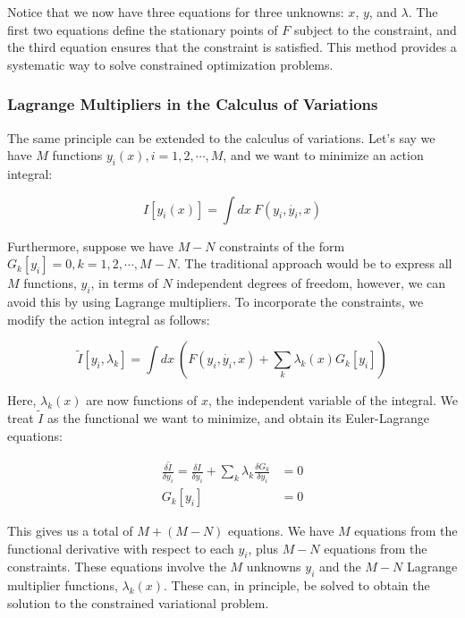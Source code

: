 Notice that we now have three equations for three unknowns: $x$, $y$, and $\lambda$. The first two equations define the stationary points of $F$ subject to the constraint, and the third equation ensures that the constraint is satisfied. This method provides a systematic way to solve constrained optimization problems.

\subsubsection{Lagrange Multipliers in the Calculus of Variations}

The same principle can be extended to the calculus of variations. Let's say we have $M$ functions $y_i\left(x\right), i = 1, 2, \cdots, M$, and we want to minimize an action integral:

\begin{equation}
    I[y_i\left(x\right)] = \int dx \ F\left(y_i, \dot{y_i}, x\right)
\end{equation}

Furthermore, suppose we have $M-N$ constraints of the form $G_k[y_i] = 0, k = 1, 2, \cdots, M - N$. The traditional approach would be to express all $M$ functions, $y_i$, in terms of $N$ independent degrees of freedom, however, we can avoid this by using Lagrange multipliers. To incorporate the constraints, we modify the action integral as follows:

\begin{equation}
    \tilde{I}[y_i, \lambda_k] = \int dx \ \left(F\left(y_i, \dot{y_i}, x\right) + \sum_k \lambda_k \left(x\right) G_k[y_i]\right)
\end{equation}

Here, $\lambda_k(x)$ are now functions of $x$, the independent variable of the integral. 
We treat $\tilde{I}$ as the functional we want to minimize, and obtain its Euler-Lagrange equations:

\begin{align}
    \frac{\delta \tilde{I}}{\delta y_i}  = \frac{\delta I}{\delta y_i} + \sum_k \lambda_k \frac{\delta G_k}{\delta y_i} &= 0 \\
    G_k[y_i] &= 0
\end{align}

This gives us a total of $M + (M - N)$ equations. We have $M$ equations from the functional derivative with respect to each $y_i$, plus $M-N$ equations from the constraints. These equations involve the $M$ unknowns  $y_i$ and the $M-N$ Lagrange multiplier functions, $\lambda_k(x)$. These can, in principle, be solved to obtain the solution to the constrained variational problem.

